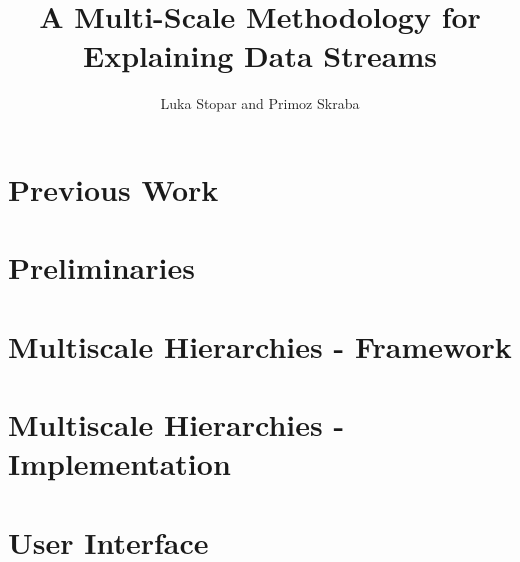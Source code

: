 \documentclass[journal]{vgtc}                %
\title{A Multi-Scale Methodology for Explaining Data Streams}
\author{Luka Stopar and Primoz Skraba}
\theoremstyle{definition}
\begin{document}

\maketitle

\label{sec:introduction}





\section{Previous Work}
\label{sec:previous}


\section{Preliminaries}


\section{Multiscale Hierarchies - Framework}
\label{sec:multiscale-framework}



\section{Multiscale Hierarchies - Implementation}
\label{sec:multiscale-implementation}


\section{User Interface}
\label{sec:ui}

\end{document}
